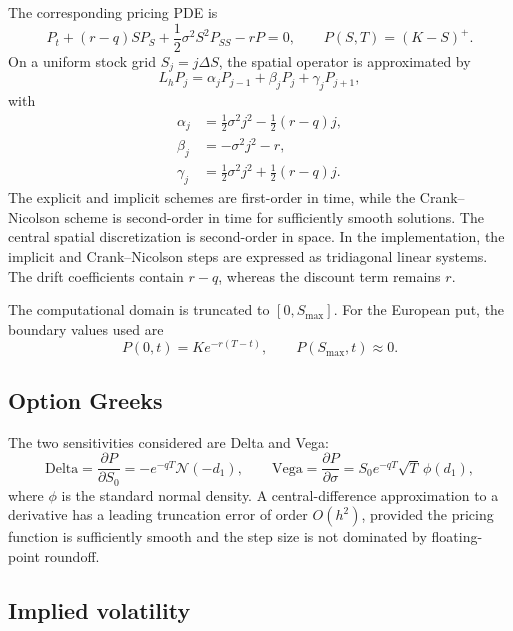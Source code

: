 \documentclass[11pt,a4paper]{article}
\newcommand{\Ncdf}{\mathcal{N}}
\newcommand{\Vega}{\mathrm{Vega}}
\newcommand{\DeltaG}{\mathrm{Delta}}
\begin{document}
The corresponding pricing PDE is
\begin{equation}
  P_t+(r-q)SP_S+\frac12\sigma^2S^2P_{SS}-rP=0,
  \qquad P(S,T)=(K-S)^+.
  \label{eq:pde}
\end{equation}
On a uniform stock grid $S_j=j\Delta S$, the spatial operator is approximated by
\begin{equation}
  L_hP_j=\alpha_jP_{j-1}+\beta_jP_j+\gamma_jP_{j+1},
\end{equation}
with
\begin{align}
  \alpha_j&=\frac12\sigma^2j^2-\frac12(r-q)j,\\
  \beta_j&=-\sigma^2j^2-r,\\
  \gamma_j&=\frac12\sigma^2j^2+\frac12(r-q)j.
\end{align}
The explicit and implicit schemes are first-order in time, while the Crank--Nicolson scheme is second-order in time for sufficiently smooth solutions. The central spatial discretization is second-order in space. In the implementation, the implicit and Crank--Nicolson steps are expressed as tridiagonal linear systems. The drift coefficients contain $r-q$, whereas the discount term remains $r$.

The computational domain is truncated to $[0,S_{\max}]$. For the European put, the boundary values used are
\begin{equation}
  P(0,t)=Ke^{-r(T-t)},\qquad P(S_{\max},t)\approx 0.
\end{equation}

\subsection{Option Greeks}

The two sensitivities considered are Delta and Vega:
\begin{equation}
  \DeltaG=\frac{\partial P}{\partial S_0}
  =-e^{-qT}\Ncdf(-d_1),\qquad
  \Vega=\frac{\partial P}{\partial \sigma}
  =S_0e^{-qT}\sqrt{T}\,\phi(d_1),
  \label{eq:greeks}
\end{equation}
where $\phi$ is the standard normal density. A central-difference approximation to a derivative has a leading truncation error of order $O(h^2)$, provided the pricing function is sufficiently smooth and the step size is not dominated by floating-point roundoff.

\subsection{Implied volatility}
\end{document}
